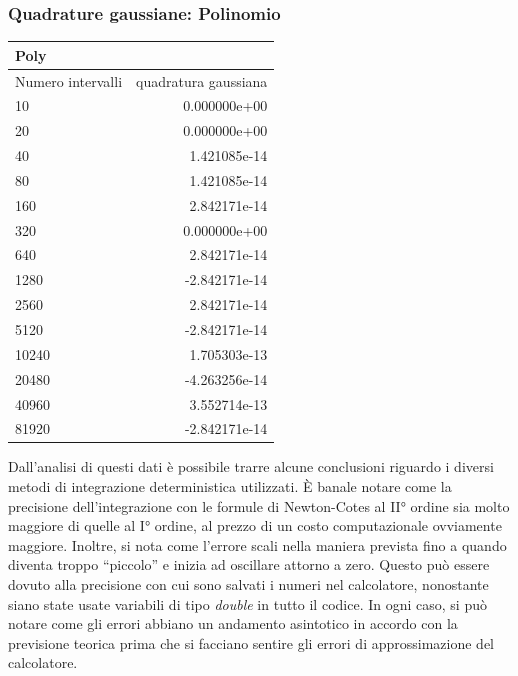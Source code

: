 \subsubsection{Quadrature gaussiane: Polinomio}
\begin{center}
\begin{longtable}[h]{lr}
\toprule
Poly & \\
\midrule
Numero intervalli & quadratura gaussiana  \\
10	&0.000000e+00 \\
20&	0.000000e+00 \\ 
40&	1.421085e-14 \\
80&	1.421085e-14 \\
160&	2.842171e-14 \\
320&	0.000000e+00 \\
640&	2.842171e-14 \\
1280&	-2.842171e-14 \\ 
2560&	2.842171e-14 \\
5120&	-2.842171e-14 \\ 
10240&	1.705303e-13 \\
20480&	-4.263256e-14 \\
40960&	3.552714e-13 \\ 
81920&	-2.842171e-14 \\
\midrule

\bottomrule
\end{longtable}
 
\end{center}
Dall'analisi di questi dati è possibile trarre alcune conclusioni riguardo i diversi metodi di integrazione deterministica utilizzati.
È banale notare come la precisione dell'integrazione con le formule di Newton-Cotes al II° ordine sia molto maggiore di quelle al I° ordine, al prezzo di un costo computazionale ovviamente maggiore.
Inoltre, si nota come l'errore scali nella maniera prevista fino a quando diventa troppo ``piccolo'' e inizia ad oscillare attorno a zero.
Questo può essere dovuto alla precisione con cui sono salvati i numeri nel calcolatore, nonostante siano state usate variabili di tipo \emph{double} in tutto il codice.
In ogni caso, si può notare come gli errori abbiano un andamento asintotico in accordo con la previsione teorica prima che si facciano sentire gli errori di approssimazione del calcolatore.
 

